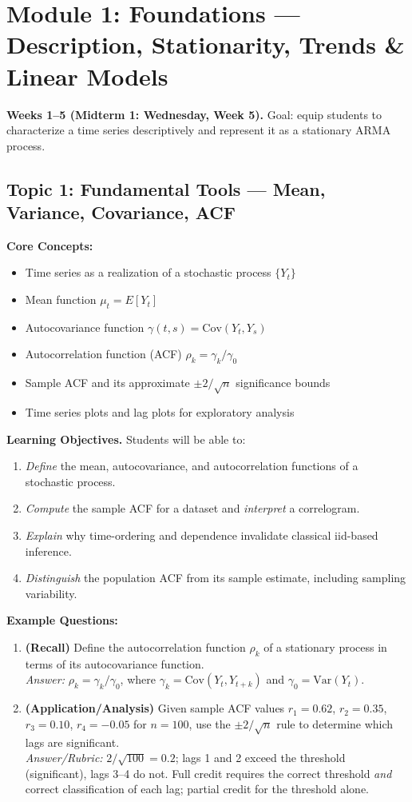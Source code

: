 \documentclass[11pt]{article}
\begin{document}
\section{Module 1: Foundations --- Description, Stationarity, Trends \& Linear Models}
\textbf{Weeks 1--5 (Midterm 1: Wednesday, Week 5).} Goal: equip students to characterize a time series descriptively and represent it as a stationary ARMA process.

\subsection{Topic 1: Fundamental Tools --- Mean, Variance, Covariance, ACF}

\textbf{Core Concepts:}
\begin{itemize}
\item Time series as a realization of a stochastic process $\{Y_t\}$
\item Mean function $\mu_t = E[Y_t]$
\item Autocovariance function $\gamma(t,s) = \text{Cov}(Y_t,Y_s)$
\item Autocorrelation function (ACF) $\rho_k = \gamma_k/\gamma_0$
\item Sample ACF and its approximate $\pm 2/\sqrt{n}$ significance bounds
\item Time series plots and lag plots for exploratory analysis
\end{itemize}

\textbf{Learning Objectives.} Students will be able to:
\begin{enumerate}
\item \emph{Define} the mean, autocovariance, and autocorrelation functions of a stochastic process.
\item \emph{Compute} the sample ACF for a dataset and \emph{interpret} a correlogram.
\item \emph{Explain} why time-ordering and dependence invalidate classical iid-based inference.
\item \emph{Distinguish} the population ACF from its sample estimate, including sampling variability.
\end{enumerate}

\textbf{Example Questions:}
\begin{enumerate}
\item \textbf{(Recall)} Define the autocorrelation function $\rho_k$ of a stationary process in terms of its autocovariance function. \\
\emph{Answer:} $\rho_k = \gamma_k/\gamma_0$, where $\gamma_k = \text{Cov}(Y_t,Y_{t+k})$ and $\gamma_0 = \text{Var}(Y_t)$.
\item \textbf{(Application/Analysis)} Given sample ACF values $r_1=0.62$, $r_2=0.35$, $r_3=0.10$, $r_4=-0.05$ for $n=100$, use the $\pm 2/\sqrt{n}$ rule to determine which lags are significant. \\
\emph{Answer/Rubric:} $2/\sqrt{100}=0.2$; lags 1 and 2 exceed the threshold (significant), lags 3--4 do not. Full credit requires the correct threshold \emph{and} correct classification of each lag; partial credit for the threshold alone.
\end{enumerate}
\end{document}
